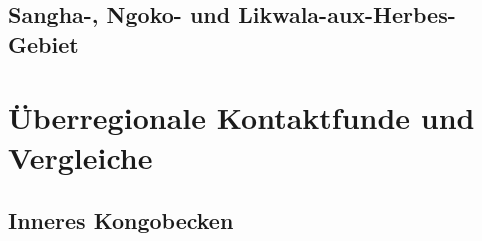 \begin{multicols}{2}

















\subsection{\mbox{Sangha}-, \mbox{Ngoko}- und Likwala-aux-Herbes-Gebiet}






























\section{Überregionale Kontaktfunde und Vergleiche}

\subsection{Inneres Kongobecken}\label{sec:InneresKongobeckenGruppen}










\end{multicols}